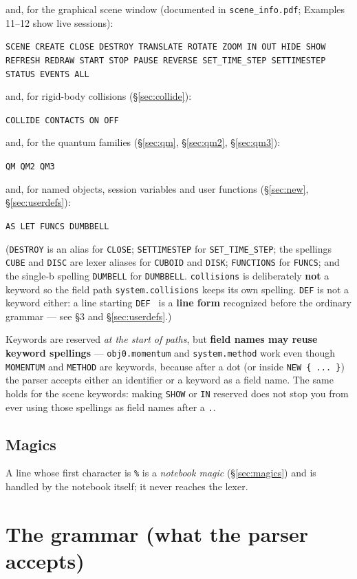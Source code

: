 \documentclass[11pt]{article}
\newcommand{\kw}[1]{\texttt{\uppercase{#1}}}
\newcommand{\code}[1]{\texttt{#1}}
\begin{document}
and, for the graphical scene window (documented in \code{scene\_info.pdf};
Examples 11--12 show live sessions):

\code{SCENE CREATE CLOSE DESTROY TRANSLATE ROTATE ZOOM IN OUT HIDE SHOW
REFRESH REDRAW START STOP PAUSE REVERSE SET\_TIME\_STEP SETTIMESTEP
STATUS EVENTS ALL}

and, for rigid-body collisions (\S\ref{sec:collide}):

\code{COLLIDE CONTACTS ON OFF}

and, for the quantum families (\S\ref{sec:qm}, \S\ref{sec:qm2},
\S\ref{sec:qm3}):

\code{QM QM2 QM3}

and, for named objects, session variables and user functions
(\S\ref{sec:new}, \S\ref{sec:userdefs}):

\code{AS LET FUNCS DUMBBELL}

(\kw{destroy} is an alias for \kw{close}; \kw{settimestep} for
\kw{set\_time\_step}; the spellings \kw{cube} and \kw{disc} are lexer
aliases for \kw{cuboid} and \kw{disk}; \kw{functions} for \kw{funcs};
and the single-b spelling \kw{dumbell} for \kw{dumbbell}.
\code{collisions} is deliberately \textbf{not} a keyword so the field
path \code{system.collisions} keeps its own spelling. \kw{def} is not
a keyword either: a line starting \code{DEF } is a \textbf{line form}
recognized before the ordinary grammar --- see \S3 and
\S\ref{sec:userdefs}.)

Keywords are reserved \emph{at the start of paths}, but \textbf{field
names may reuse keyword spellings} --- \code{obj0.momentum} and
\code{system.method} work even though \kw{momentum} and \kw{method} are
keywords, because after a dot (or inside \code{NEW \{ ... \}}) the parser
accepts either an identifier or a keyword as a field name. The same
holds for the scene keywords: making \kw{show} or \kw{in} reserved does
not stop you from ever using those spellings as field names after a
\code{.}.

\subsection{Magics}

A line whose first character is \code{\%} is a \emph{notebook magic}
(\S\ref{sec:magics}) and is handled by the notebook itself; it never
reaches the lexer.

\section{The grammar (what the parser accepts)}
\end{document}
